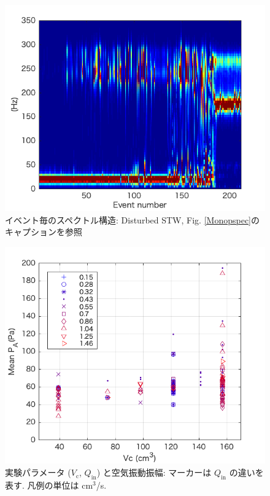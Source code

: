 \documentclass[12pt]{article}
\begin{document}
\begin{figure}[H]
\begin{center}
\includegraphics[scale=1] {Distpspec.png} 
\caption[イベント毎のスペクトル構造: Disturbed STW]
{イベント毎のスペクトル構造: Disturbed STW, Fig. \ref{Monopspec}のキャプションを参照}
\label{Distpspec}
\end{center}
\end{figure} 


\begin{figure}[H]
\begin{center}
\includegraphics[scale=1] {QVA.png} 
\caption[実験パラメータと空気振動振幅]
{実験パラメータ ($V_\mathrm{c}$, $Q_\mathrm{in}$) と空気振動振幅: マーカーは $Q_\mathrm{in}$ の違いを表す. 凡例の単位は cm$^3$/s.}
\label{QVA}
\end{center}
\end{figure} 
\end{document}
